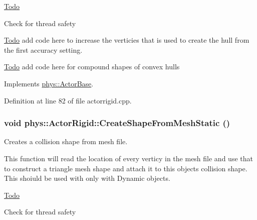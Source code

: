 \begin{Desc}
\item[\hyperlink{todo__todo000002}{Todo}]
\begin{DoxyItemize}
\item Check for thread safety 
\end{DoxyItemize}\end{Desc}


\begin{Desc}
\item[\hyperlink{todo__todo000003}{Todo}]add code here to increase the verticies that is used to create the hull from the first accuracy setting. \end{Desc}


\begin{Desc}
\item[\hyperlink{todo__todo000004}{Todo}]add code here for compound shapes of convex hulls \end{Desc}




Implements \hyperlink{classphys_1_1ActorBase_aa41370f6d2031a9dad8df45bd7f3bcc6}{phys::ActorBase}.



Definition at line 82 of file actorrigid.cpp.

\hypertarget{classphys_1_1ActorRigid_a84554dcaaf2475ba0ec7dcb9235050ac}{
\subsubsection[{CreateShapeFromMeshStatic}]{\setlength{\rightskip}{0pt plus 5cm}void phys::ActorRigid::CreateShapeFromMeshStatic ()}}
\label{d8/d71/classphys_1_1ActorRigid_a84554dcaaf2475ba0ec7dcb9235050ac}


Creates a collision shape from mesh file. 

This function will read the location of every verticy in the mesh file and use that to construct a triangle mesh shape and attach it to this objects collision shape. This shoiuld be used with only with Dynamic objects. 

\begin{Desc}
\item[\hyperlink{todo__todo000005}{Todo}]
\begin{DoxyItemize}
\item Check for thread safety 
\end{DoxyItemize}\end{Desc}




